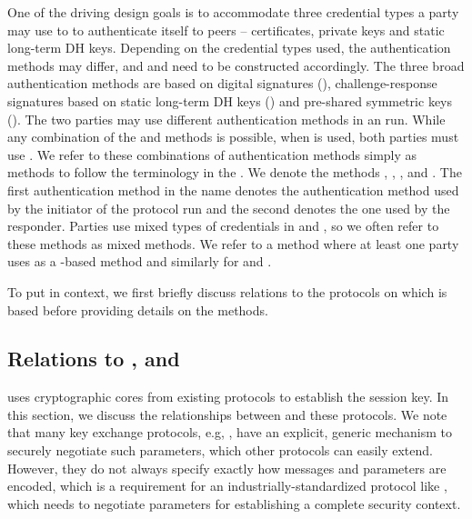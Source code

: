 One of the driving design goals is to accommodate three credential types
a party may use to to authenticate itself to peers -- certificates, private keys
and static long-term DH keys. Depending on the credential types used, the authentication methods may differ, and \mAuthi{} and \mAuthr{} need to be constructed accordingly.
%
%
The three broad authentication methods are based on digital signatures (\mSig), challenge-response signatures based on static long-term DH keys (\mStat) and pre-shared symmetric keys (\mPsk). The two parties may use different authentication methods in an \mEdhoc{} run.
%
While any combination of the \mSig{} and \mStat{} methods is possible, when \mPsk{} is used, both parties must use \mPsk{}.
%
We refer to these combinations of authentication methods simply as methods to follow the terminology in the \mSpec{}.
%
We denote the methods \mSigSig, \mSigStat, \mStatStat, \mStatSig{} and \mPskPsk.
%
The first authentication method in the name denotes the authentication method used by the initiator of the protocol run and the second denotes the one used by the responder.
%
Parties use mixed types of credentials in \mSigStat{} and \mStatSig{}, so
we often refer to these methods as mixed methods.
%
We refer to a method where at least one party uses \mSig{} as a \mSig-based method and similarly for \mStat{} and \mPsk.
%

To put \mEdhoc{} in context, we first briefly discuss relations to
the protocols on which \mEdhoc{} is based before providing details on the
methods.
%

\spacehack
\subsection{Relations to \mSigma, \mOptls{} and \mNoise{}}
\label{sec:relationsToOtherProtocols}
\fillhack
\mEdhoc{} uses cryptographic cores from existing protocols to
establish the session key. In this section, we discuss the relationships between \mEdhoc{} and these protocols.
%
%
%
We note that many key exchange protocols, e.g, \mSigma{}, have an explicit, generic mechanism to securely negotiate such parameters, which other protocols can easily extend. However, they do not always specify exactly how messages and parameters are encoded, which is a requirement for an industrially-standardized protocol like \mEdhoc{}, which needs to negotiate parameters for establishing a complete \mOscore{} security context.
%
%

